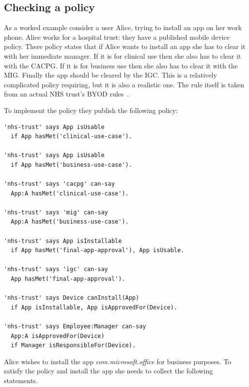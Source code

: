 \documentclass[thesis.tex]{subfiles}
\begin{document}
\subsection{Checking a policy}

As a worked example consider a user Alice, trying to install an app on her work phone.
Alice works for a hospital trust: they have a published mobile device policy.%
There policy states that if Alice wants to install an app she has to clear it with her immediate manager.
If it is for clinical use then she also has to clear it with the \ac{CACPG}.
If it is for business use then she also has to clear it with the \ac{MIG}.
Finally the app should be cleared by the \ac{IGC}.
This is a relatively complicated policy requiring, but it is also a realistic one.
The rule itself is taken from an actual NHS trust's BYOD rules~\cite{kennington_mobiles_2014}.

To implement the policy they publish the following policy:
\begin{lstlisting}
'nhs-trust' says App isUsable 
  if App hasMet('clinical-use-case').

'nhs-trust' says App isUsable 
  if App hasMet('business-use-case').

'nhs-trust' says 'cacpg' can-say 
  App:A hasMet('clinical-use-case').

'nhs-trust' says 'mig' can-say 
  App:A hasMet('business-use-case').

'nhs-trust' says App isInstallable
  if App hasMet('final-app-approval'), App isUsable.

'nhs-trust' says 'igc' can-say 
  App hasMet('final-app-approval').

'nhs-trust' says Device canInstall(App)
  if App isInstallable, App isApprovedFor(Device).

'nhs-trust' says Employee:Manager can-say
  App:A isApprovedFor(Device)
  if Manager isResponsibleFor(Device).
\end{lstlisting}

Alice wishes to install the app \emph{\ttfamily com.microsoft.office} for business purposes.
To satisfy the policy and install the app she needs to collect the following statements.
\end{document}
